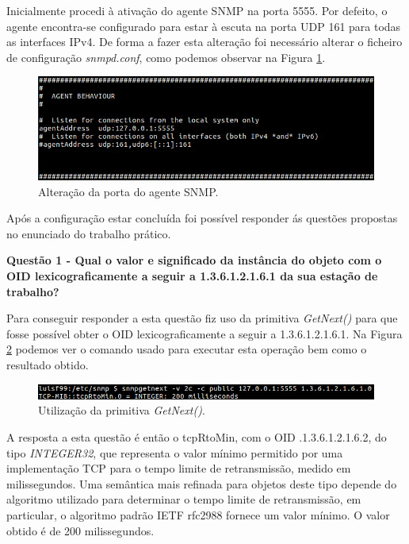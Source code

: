 \documentclass[../momento_1.tex]{subfiles}
\begin{document}
Inicialmente procedi à ativação do agente SNMP na porta 5555. Por defeito, o agente encontra-se configurado para estar à escuta na porta UDP 161 para todas as interfaces IPv4. De forma a fazer esta alteração foi necessário alterar o ficheiro de configuração \textit{snmpd.conf}, como podemos observar na Figura \ref{fig:conf}.\par 

\begin{figure}[H]
\centering
\captionsetup{justification=centering,margin=2cm}
\centerline{\includegraphics[scale=0.6]{../imagens/port.png}}
\caption{Alteração da porta do agente SNMP.}
\label{fig:conf}
\end{figure}

Após a configuração estar concluída foi possível responder ás questões propostas no enunciado do trabalho prático.\par
 
\textbf{Questão 1 - Qual o valor e significado da instância do objeto com o OID lexicograficamente a
seguir a 1.3.6.1.2.1.6.1 da sua estação de trabalho?}\par

Para conseguir responder a esta questão fiz uso da primitiva \textit{GetNext()} para que fosse possível obter o OID lexicograficamente a seguir a 1.3.6.1.2.1.6.1.
Na Figura \ref{fig:next} podemos ver o comando usado para executar esta operação bem como o resultado obtido.\par

\begin{figure}[H]
\centering
\captionsetup{justification=centering,margin=2cm}
\centerline{\includegraphics[scale=0.6]{../imagens/getNext.png}}
\caption{Utilização da primitiva \textit{GetNext()}.}
\label{fig:next}
\end{figure}

A resposta a esta questão é então o tcpRtoMin, com o OID .1.3.6.1.2.1.6.2, do tipo \textit{INTEGER32}, que representa o valor mínimo permitido por uma implementação TCP para o tempo limite de retransmissão, medido em milissegundos. Uma semântica mais refinada para objetos deste tipo depende do algoritmo utilizado para determinar o tempo limite de retransmissão, em particular, o algoritmo padrão IETF rfc2988 fornece um valor mínimo. O valor obtido é de 200 milissegundos.\par
\end{document}
